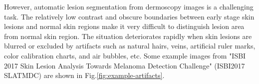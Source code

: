 \documentclass{article}
\begin{document}
However, automatic lesion segmentation from dermoscopy images is a challenging task. The relatively low contrast and obscure boundaries between early stage skin lesions and normal skin regions make it very difficult to distinguish lesion area from normal skin region. The situation deteriorates rapidly when skin lesions are blurred or excluded by artifacts such as natural hairs, veins, artificial ruler marks, color calibration charts, and air bubbles, etc. Some example images from  
"ISBI 2017 Skin Lesion Analysis Towards Melanoma Detection Challenge" (ISBI2017 SLATMDC)\cite{2017-ISBI-SkinLesionChallenge} are shown in Fig.\ref{fig:example-artifacts}.
\end{document}

